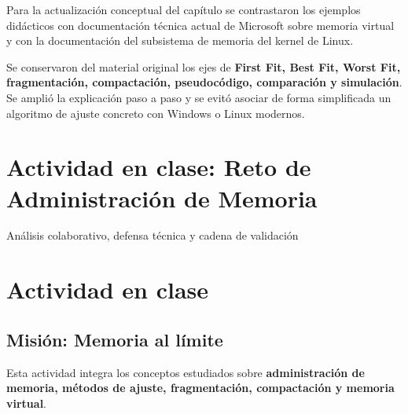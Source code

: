 \documentclass[
  spanish,
  letterpaper,
]{scrbook}
\begin{document}
Para la actualización conceptual del capítulo se contrastaron los
ejemplos didácticos con documentación técnica actual de Microsoft sobre
memoria virtual y con la documentación del subsistema de memoria del
kernel de Linux.

\begin{tcolorbox}[enhanced jigsaw, arc=.35mm, bottomrule=.15mm, bottomtitle=1mm, breakable, colback=white, colbacktitle=quarto-callout-note-color!10!white, colframe=quarto-callout-note-color-frame, coltitle=black, left=2mm, leftrule=.75mm, opacityback=0, opacitybacktitle=0.6, rightrule=.15mm, title=\textcolor{quarto-callout-note-color}{\faInfo}\hspace{0.5em}{Criterio editorial}, titlerule=0mm, toprule=.15mm, toptitle=1mm]

Se conservaron del material original los ejes de \textbf{First Fit, Best
Fit, Worst Fit, fragmentación, compactación, pseudocódigo, comparación y
simulación}. Se amplió la explicación paso a paso y se evitó asociar de
forma simplificada un algoritmo de ajuste concreto con Windows o Linux
modernos.

\end{tcolorbox}


\chapter{Actividad en clase: Reto de Administración de
Memoria}\label{actividad-en-clase-reto-de-administraciuxf3n-de-memoria}

Análisis colaborativo, defensa técnica y cadena de validación

\hfill\break


\chapter{Actividad en clase}\label{actividad-en-clase}

\section{Misión: Memoria al
límite}\label{misiuxf3n-memoria-al-luxedmite}

Esta actividad integra los conceptos estudiados sobre
\textbf{administración de memoria, métodos de ajuste, fragmentación,
compactación y memoria virtual}.
\end{document}
